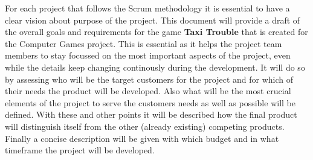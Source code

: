 For each project that follows the Scrum methodology it is essential to have a clear vision about purpose of the project. This document will provide a draft of the overall goals and requirements for the game \textbf{Taxi Trouble} that is created for the Computer Games project. This is essential as it helps the project team members to stay focussed on the most important aspects of the project, even while the details keep changing continously during the development. It will do so by assessing who will be the target customers for the project and for which of their needs the product will be developed. Also what will be the most crucial elements of the project to serve the customers needs as well as possible will be defined. With these and other points it will be described how the final product will distinguish itself from the other (already existing) competing products. Finally a concise description will be given with which budget and in what timeframe the project will be developed.



